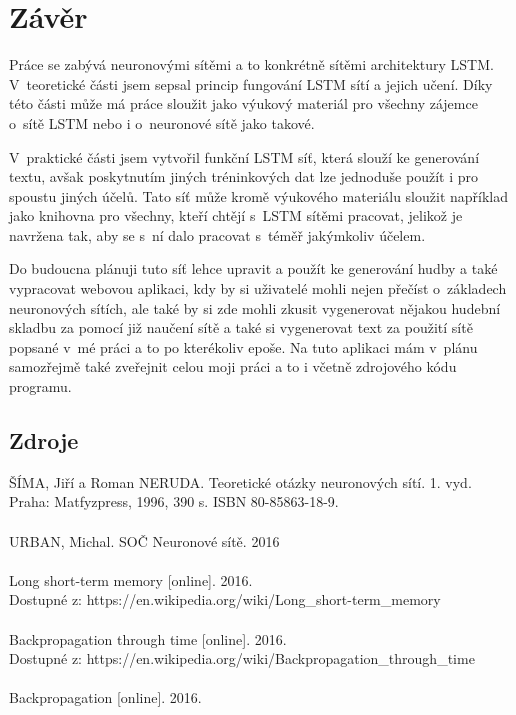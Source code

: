 \documentclass[a4paper]{article}
\begin{document}
\section*{Závěr}
Práce se zabývá neuronovými sítěmi a to konkrétně sítěmi architektury LSTM. V~teoretické části jsem sepsal princip fungování LSTM sítí a jejich učení. Díky této části může má práce sloužit jako výukový materiál pro všechny zájemce o~sítě LSTM nebo i o~neuronové sítě jako takové.\par
V~praktické části jsem vytvořil funkční LSTM síť, která slouží ke generování textu, avšak poskytnutím jiných tréninkových dat lze jednoduše použít i pro spoustu jiných účelů. Tato síť může kromě výukového materiálu sloužit například jako knihovna pro všechny, kteří chtějí s~LSTM sítěmi pracovat, jelikož je navržena tak, aby se s~ní dalo pracovat s~téměř jakýmkoliv účelem.\par
Do budoucna plánuji tuto síť lehce upravit a použít ke generování hudby a také vypracovat webovou aplikaci, kdy by si uživatelé mohli nejen přečíst o~základech neuronových sítích, ale také by si zde mohli zkusit vygenerovat nějakou hudební skladbu za pomocí již naučení sítě a také si vygenerovat text za použití sítě popsané v~mé práci a to po kterékoliv epoše. Na tuto aplikaci mám v~plánu samozřejmě také zveřejnit celou moji práci a to i včetně zdrojového kódu programu.
\clearpage
\begin{center}
\section*{Zdroje}
\end{center}
ŠÍMA, Jiří a Roman NERUDA. Teoretické otázky neuronových sítí. 1. vyd. Praha: Matfyzpress, 1996, 390 s. ISBN 80-85863-18-9.\\
~\\
URBAN, Michal. SOČ Neuronové sítě. 2016\\
~\\
Long short-term memory [online]. 2016.\\
Dostupné z: https://en.wikipedia.org/wiki/Long\_short-term\_memory\\%
~\\
Backpropagation through time [online]. 2016.\\
Dostupné z: https://en.wikipedia.org/wiki/Backpropagation\_through\_time\\%
~\\
Backpropagation [online]. 2016.\\
\end{document}
